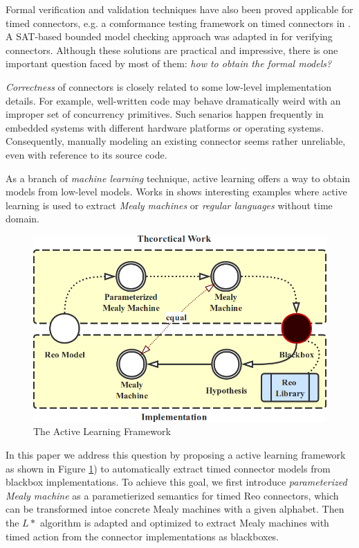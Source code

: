 \documentclass[conference, a4paper]{IEEEtran}
\begin{document}
Formal verification and validation techniques have also been proved applicable for timed connectors, 
e.g. a comformance testing framework on timed connectors in \cite{DBLP:conf/tase/LiCWS15}.
A SAT-based bounded model checking approach was adapted in \cite{DBLP:journals/scp/Kemper12} for
verifying connectors. Although these solutions are practical and impressive, there is one important
question faced by most of them: \emph{how to obtain the formal models?}

\emph{Correctness} of connectors is closely related to some low-level implementation details.
For example, well-written code may behave dramatically weird with an improper set of concurrency
primitives. Such senarios happen frequently in embedded systems with different hardware platforms or
operating systems. Consequently, manually modeling an existing connector seems rather unreliable,
even with reference to its source code.

As a branch of \emph{machine learning} technique, active learning offers a way to obtain models from
low-level models. Works in \cite{DBLP:journals/mt/Daelemans10, DBLP:journals/iandc/Angluin87,
DBLP:conf/fase/RaffeltS06} shows interesting examples where active learning is used to extract
\emph{Mealy machines} or \emph{regular languages} without time domain.

\begin{figure}[ht]
  \begin{center}
    \includegraphics[width=.4\textwidth]{./images/howto.png}
  \end{center}
  \caption{The Active Learning Framework}
  \label{fig:howto}
\end{figure}

In this paper we address this question by proposing a active learning framework as shown in Figure
\ref{fig:howto}) to automatically extract timed connector models from blackbox implementations. 
To achieve this goal, we first introduce \emph{parameterized Mealy machine} as a parametierized
semantics for timed Reo connectors, which can be transformed intoe concrete Mealy machines with a
given alphabet. Then the $L*$ algorithm \cite{DBLP:journals/iandc/Angluin87} is adapted and
optimized to extract Mealy machines with timed action from the connector implementations as
blackboxes. 
\end{document}
